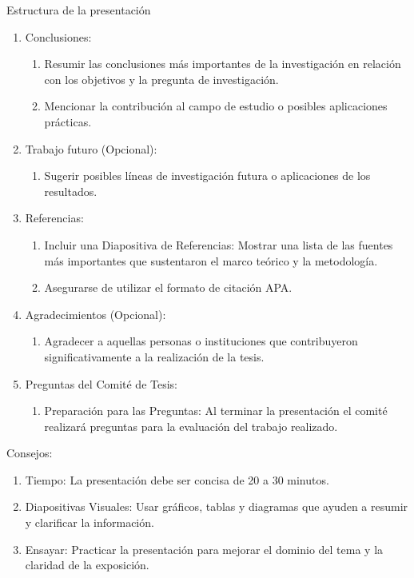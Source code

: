 \documentclass[9pt]{beamer}
\begin{document}
\begin{frame}{Estructura de la presentación}
\begin{enumerate}
\begin{enumerate}
    \end{enumerate}
    \item Conclusiones:
    \begin{enumerate}
        \item Resumir las conclusiones más importantes de la investigación en relación con los objetivos y la pregunta de investigación.
        \item Mencionar la contribución al campo de estudio o posibles aplicaciones prácticas.
    \end{enumerate}
    \item Trabajo futuro (Opcional):
    \begin{enumerate}
        \item Sugerir posibles líneas de investigación futura o aplicaciones de los resultados.
    \end{enumerate}
    \item Referencias:
    \begin{enumerate}
        \item Incluir una Diapositiva de Referencias: Mostrar una lista de las fuentes más importantes que sustentaron el marco teórico y la metodología.
        \item Asegurarse de utilizar el formato de citación APA.
    \end{enumerate}
    \item Agradecimientos (Opcional):
    \begin{enumerate}
        \item Agradecer a aquellas personas o instituciones que contribuyeron significativamente a la realización de la tesis.
    \end{enumerate}
    \item Preguntas del Comité de Tesis:
    \begin{enumerate}
        \item Preparación para las Preguntas: Al terminar la presentación el comité realizará preguntas para la evaluación del trabajo realizado.
    \end{enumerate}
\end{enumerate}
\pagebreak
Consejos:

\begin{enumerate}
    \item [] Tiempo: La presentación debe ser concisa de 20 a 30 minutos.
    \item [] Diapositivas Visuales: Usar gráficos, tablas y diagramas que ayuden a resumir y clarificar la información.
    \item [] Ensayar: Practicar la presentación para mejorar el dominio del tema y la claridad de la exposición.
\end{enumerate}
\end{frame}
\end{document}
